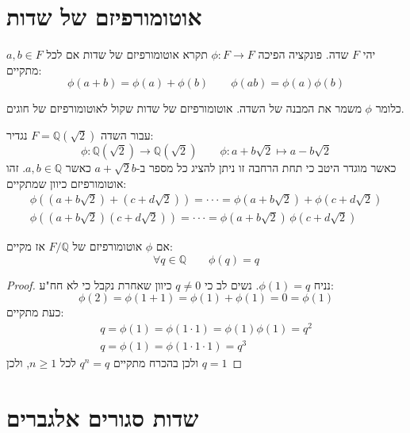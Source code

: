 \documentclass{tstextbook}
\begin{document}
\section{אוטומורפיזם של שדות}

\begin{definition}
יהי \(F\) שדה. פונקציה הפיכה \(\phi:F\to F\) תקרא אוטומורפיזם של שדות אם לכל \(a,b\in F\) מתקיים:
$$\phi(a+b)=\phi(a)+\phi(b)\qquad \phi(ab)=\phi(a)\phi(b)$$

\end{definition}
כלומר \(\phi\) משמר את המבנה של השדה. אוטומורפיזם של שדות שקול לאוטומורפיזם של חוגים.

\begin{example}
עבור השדה \(F=\mathbb{Q}\left( \sqrt{ 2 } \right)\) נגדיר:
$$\phi:\mathbb{Q} \left( \sqrt{ 2 } \right)\to\mathbb{Q} \left( \sqrt{ 2 } \right) \qquad \phi:a+b\sqrt{ 2 }\mapsto a-b\sqrt{ 2 }$$
כאשר מוגדר היטב כי תחת הרחבה זו ניתן להציג כל מספר ב-\(a+\sqrt{ 2 }b\) כאשר \(a,b \in \mathbb{Q}\). זהו אוטומורפיזם כיוון שמתקיים:
\begin{gather*}\phi\left( \left( a+b{\sqrt{2}} \right)+\left( c+d{\sqrt{2}} \right) \right)=\cdot\cdot\cdot=\phi\left( a+b{\sqrt{2}} \right)+\phi\left( c+d{\sqrt{2}} \right)  \\\phi((a+b{\sqrt{2}})(c+d{\sqrt{2}}))=\cdot\cdot\cdot=\phi(a+b{\sqrt{2}})\,\phi(c+d{\sqrt{2}})
\end{gather*}

\end{example}
\begin{proposition}
אם \(\phi\) אוטומורפיזם של \(F / \mathbb{Q}\) אז מקיים:
$$\forall q \in \mathbb{Q} \qquad \phi(q)=q$$

\end{proposition}
\begin{proof}
נניח \(\phi(1)=q\). נשים לב כי \(q\neq0\) כיוון שאחרת נקבל כי לא חח"ע:
$$\phi(2)=\phi(1+1)=\phi(1)+\phi(1)=0=\phi(1)$$
כעת מתקיים:
\begin{gather*}q=\phi(1)=\phi\left( 1\cdot 1 \right)=\phi(1)\phi(1)=q^2  \\q=\phi(1)=\phi\left( 1\cdot 1 \cdot 1 \right)=q^3 
\end{gather*}
ולכן בהכרח מתקיים \(q^n=q\) לכל \(n\geq 1\), ולכן \(q=1\)

\end{proof}
\section{שדות סגורים אלגברים}
\end{document}
